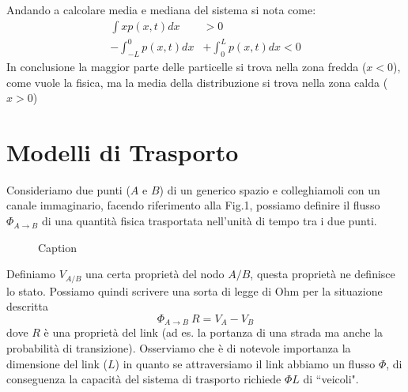 \documentclass[12pt, a4paper]{article}
\theoremstyle{theorem}
\begin{document}
			Andando a calcolare media e mediana del sistema si nota come:
			\begin{equation}
				\begin{split}
					\int xp(x,t)dx&>0\\
					-\int_{-L}^0p(x,t)dx&+\int_0^Lp(x,t)dx<0
				\end{split}
			\end{equation}
			In conclusione la maggior parte delle particelle si trova nella zona fredda ($x<0$), come vuole la fisica, ma la media della distribuzione si trova nella zona calda ($x>0$)
	\section{Modelli di Trasporto}
		Consideriamo due punti ($A$ e $B$) di un generico spazio e colleghiamoli con un canale immaginario, facendo riferimento alla Fig.1, possiamo definire il flusso $\Phi_{A \rightarrow B}$ di una quantità fisica trasportata nell'unità di tempo tra i due punti.
		\begin{figure}[ht!]
    			\centering
    			\caption{Caption}
		\end{figure}
		Definiamo $V_{A/B}$ una certa proprietà del nodo $A/B$, questa proprietà ne definisce lo stato. Possiamo quindi scrivere una sorta di legge di Ohm per la situazione descritta 
		\begin{equation}
    			\Phi_{A \rightarrow B} \ R = V_A - V_B
		\end{equation} dove $R$ è una proprietà del link (ad es. la portanza di una strada ma anche la probabilità di transizione).
		Osserviamo che è di notevole importanza la dimensione del link ($L$) in quanto se attraversiamo il link abbiamo un flusso $\Phi$, di conseguenza la capacità del sistema di trasporto richiede $\Phi L$ di “veicoli".			
			
\end{document}
